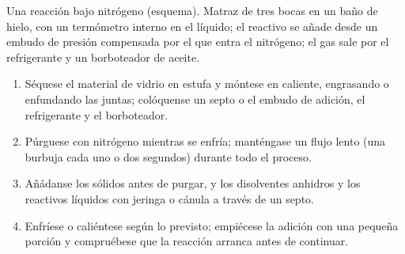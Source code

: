 \begin{omfigure}
\par\vspace{4pt}

{\small Una reacción bajo nitrógeno (esquema). Matraz de tres bocas en un baño de hielo, con un termómetro
interno en el líquido; el reactivo se añade desde un embudo de presión compensada por el que entra el
nitrógeno; el gas sale por el refrigerante y un borboteador de aceite.}
\end{omfigure}

\begin{method}\label{met:b2:lab-techniques-2:anhydrous}
\begin{enumerate}
  \item Séquese el material de vidrio en estufa y móntese en caliente, engrasando o enfundando las juntas; colóquense un septo
        o el embudo de adición, el refrigerante y el borboteador.
  \item Púrguese con nitrógeno mientras se enfría; manténgase un flujo lento (una burbuja cada uno o dos segundos) durante todo el proceso.
  \item Añádanse los sólidos antes de purgar, y los disolventes anhidros y los reactivos líquidos con jeringa o cánula a través de un
        septo.
  \item Enfríese o caliéntese según lo previsto; empiécese la adición con una pequeña porción y compruébese que la reacción
        arranca antes de continuar.
\end{enumerate}
\end{method}


